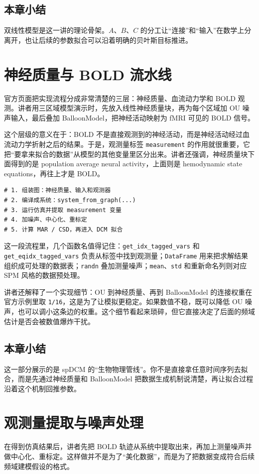\documentclass[a4paper]{article}
\begin{document}
\subsection{本章小结}
双线性模型是这一讲的理论骨架。$A$、$B$、$C$ 的分工让“连接”和“输入”在数学上分离开，也让后续的参数拟合可以沿着明确的贝叶斯目标推进。

\section{神经质量与 BOLD 流水线}
官方页面把实现流程分成非常清楚的三层：神经质量、血流动力学和 BOLD 观测。讲者用三区域模型演示时，先放入线性神经质量块，再为每个区域加 OU 噪声输入，最后叠加 BalloonModel，把神经活动映射为 fMRI 可见的 BOLD 信号。

这个层级的意义在于：BOLD 不是直接观测到的神经活动，而是神经活动经过血流动力学折射之后的结果。于是，观测量标签 \texttt{measurement} 的作用就很重要，它把“要拿来拟合的数据”从模型的其他变量里区分出来。讲者还强调，神经质量块下面得到的是 population average neural activity，上面则是 hemodynamic state equations，再往上才是 BOLD。

\begin{lstlisting}[caption={Neuroblox 中的实现骨架}]
# 1. 组装图：神经质量、输入和观测器
# 2. 编译成系统：system_from_graph(...)
# 3. 运行仿真并提取 measurement 变量
# 4. 加噪声、中心化、重标定
# 5. 计算 MAR / CSD，再进入 DCM 拟合
\end{lstlisting}

这一段流程里，几个函数名值得记住：\texttt{get\_idx\_tagged\_vars} 和 \texttt{get\_eqidx\_tagged\_vars} 负责从标签中找到观测量；\texttt{DataFrame} 用来把求解结果组织成可处理的数据表；\texttt{randn} 叠加测量噪声；\texttt{mean}、\texttt{std} 和重新命名列则对应 SPM 风格的数据预处理。

讲者还解释了一个实现细节：OU 到神经质量、再到 BalloonModel 的连接权重在官方示例里取 \texttt{1/16}，这是为了让模拟更稳定。如果数值不稳，既可以降低 OU 噪声，也可以调小这条边的权重。这个细节看起来琐碎，但它直接决定了后面的频域估计是否会被数值爆炸干扰。

\subsection{本章小结}
这一部分展示的是 spDCM 的“生物物理管线”。你不是直接拿任意时间序列去拟合，而是先通过神经质量和 BalloonModel 把数据生成机制说清楚，再让拟合过程沿着这个机制回推参数。

\section{观测量提取与噪声处理}
在得到仿真结果后，讲者先把 BOLD 轨迹从系统中提取出来，再加上测量噪声并做中心化、重标定。这样做并不是为了“美化数据”，而是为了把数据变成符合后续频域建模假设的格式。
\end{document}
